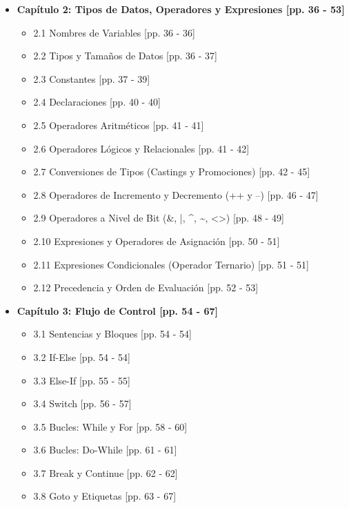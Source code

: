\documentclass[11pt,a4paper]{article}
\begin{document}
\begin{itemize}
    \item \textbf{Capítulo 2: Tipos de Datos, Operadores y Expresiones [pp. 36 - 53]}
    \begin{itemize}
        \item 2.1 Nombres de Variables [pp. 36 - 36]
        \item 2.2 Tipos y Tamaños de Datos [pp. 36 - 37]
        \item 2.3 Constantes [pp. 37 - 39]
        \item 2.4 Declaraciones [pp. 40 - 40]
        \item 2.5 Operadores Aritméticos [pp. 41 - 41]
        \item 2.6 Operadores Lógicos y Relacionales [pp. 41 - 42]
        \item 2.7 Conversiones de Tipos (Castings y Promociones) [pp. 42 - 45]
        \item 2.8 Operadores de Incremento y Decremento (++ y --) [pp. 46 - 47]
        \item 2.9 Operadores a Nivel de Bit (\&, |, \^{}, \~{}, <\!<, >\!>) [pp. 48 - 49]
        \item 2.10 Expresiones y Operadores de Asignación [pp. 50 - 51]
        \item 2.11 Expresiones Condicionales (Operador Ternario) [pp. 51 - 51]
        \item 2.12 Precedencia y Orden de Evaluación [pp. 52 - 53]
    \end{itemize}

    \item \textbf{Capítulo 3: Flujo de Control [pp. 54 - 67]}
    \begin{itemize}
        \item 3.1 Sentencias y Bloques [pp. 54 - 54]
        \item 3.2 If-Else [pp. 54 - 54]
        \item 3.3 Else-If [pp. 55 - 55]
        \item 3.4 Switch [pp. 56 - 57]
        \item 3.5 Bucles: While y For [pp. 58 - 60]
        \item 3.6 Bucles: Do-While [pp. 61 - 61]
        \item 3.7 Break y Continue [pp. 62 - 62]
        \item 3.8 Goto y Etiquetas [pp. 63 - 67]
    \end{itemize}


\end{itemize}
\end{document}
